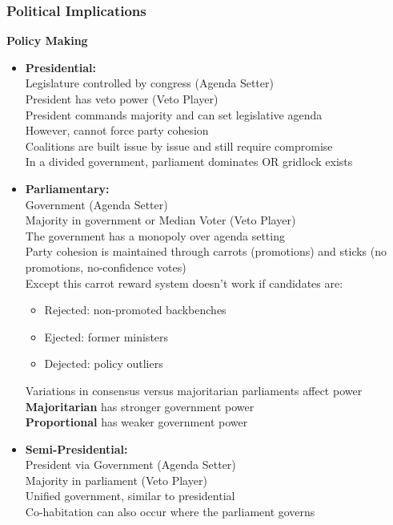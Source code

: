 \documentclass[12pt, letterpaper]{article}
\begin{document}
\subsubsection{Political Implications}
\textbf{Policy Making}
\begin{itemize}
	\item \textbf{Presidential:}\\
		Legislature controlled by congress (Agenda Setter)\\
		President has veto power (Veto Player)\\
		President commands majority and can set legislative agenda\\
		However, cannot force party cohesion\\
		Coalitions are built issue by issue and still require compromise\\
		In a divided government, parliament dominates OR gridlock exists
	\item \textbf{Parliamentary:}\\
		Government (Agenda Setter)\\
		Majority in government or Median Voter (Veto Player)\\
		The government has a monopoly over agenda setting\\
		Party cohesion is maintained through carrots (promotions) and sticks (no promotions, no-confidence votes)\\
		Except this carrot reward system doesn't work if candidates are:
		\begin{itemize}
			\item Rejected: non-promoted backbenches
			\item Ejected: former ministers
			\item Dejected: policy outliers
		\end{itemize}
		Variations in consensus versus majoritarian parliaments affect power\\
		\textbf{Majoritarian} has stronger government power\\
		\textbf{Proportional} has weaker government power
	\item \textbf{Semi-Presidential:}\\
		President via Government (Agenda Setter)\\
		Majority in parliament (Veto Player)\\
		Unified government, similar to presidential\\
		Co-habitation can also occur where the parliament governs
\end{itemize}
\end{document}
